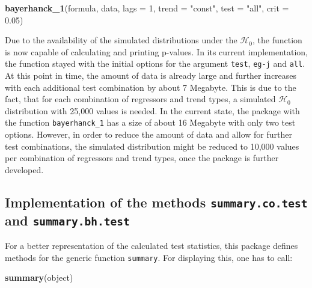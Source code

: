 \documentclass[11pt,a4paper]{article}
\newenvironment{Shaded}{\begin{snugshade}}{\end{snugshade}}
\newcommand{\DataTypeTok}[1]{\textcolor[rgb]{0.13,0.29,0.53}{#1}}
\newcommand{\DecValTok}[1]{\textcolor[rgb]{0.00,0.00,0.81}{#1}}
\newcommand{\FloatTok}[1]{\textcolor[rgb]{0.00,0.00,0.81}{#1}}
\newcommand{\KeywordTok}[1]{\textcolor[rgb]{0.13,0.29,0.53}{\textbf{#1}}}
\newcommand{\NormalTok}[1]{#1}
\newcommand{\StringTok}[1]{\textcolor[rgb]{0.31,0.60,0.02}{#1}}
\begin{document}
\begin{Shaded}
\begin{Highlighting}[]
\KeywordTok{bayerhanck_1}\NormalTok{(formula, data, }\DataTypeTok{lags =} \DecValTok{1}\NormalTok{, }\DataTypeTok{trend =} \StringTok{"const"}\NormalTok{, }
           \DataTypeTok{test =} \StringTok{"all"}\NormalTok{, }\DataTypeTok{crit =} \FloatTok{0.05}\NormalTok{)}
\end{Highlighting}
\end{Shaded}

Due to the availability of the simulated distributions under the
\(\mathcal{H}_0\), the function is now capable of calculating and
printing p-values. In its current implementation, the function stayed
with the initial options for the argument \texttt{test}, \texttt{eg-j}
and \texttt{all}. At this point in time, the amount of data is already
large and further increases with each additional test combination by
about 7 Megabyte. This is due to the fact, that for each combination of
regressors and trend types, a simulated \(\mathcal{H}_0\) distribution
with 25,000 values is needed. In the current state, the package with the
function \texttt{bayerhanck\_1} has a size of about 16 Megabyte with
only two test options. However, in order to reduce the amount of data
and allow for further test combinations, the simulated distribution
might be reduced to 10,000 values per combination of regressors and
trend types, once the package is further developed.

\hypertarget{implementation-of-the-methods-summary.co.test-and-summary.bh.test}{%
\subsection{\texorpdfstring{Implementation of the methods
\texttt{summary.co.test} and
\texttt{summary.bh.test}}{Implementation of the methods summary.co.test and summary.bh.test}}\label{implementation-of-the-methods-summary.co.test-and-summary.bh.test}}

For a better representation of the calculated test statistics, this
package defines methods for the generic function \texttt{summary}. For
displaying this, one has to call:

\begin{Shaded}
\begin{Highlighting}[]
\KeywordTok{summary}\NormalTok{(object)}
\end{Highlighting}
\end{Shaded}
\end{document}
